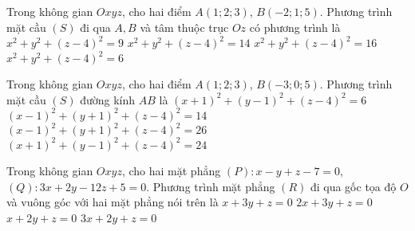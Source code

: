 \begin{ex}%
	Trong không gian $Oxyz$, cho hai điểm $A(1;2;3)$, $B(-2;1;5)$. Phương trình mặt cầu $(S)$ đi qua $A,B$ và tâm thuộc trục $Oz$ có phương trình là
	\choice
	{$x^2+y^2+(z-4)^2=9$}
	{$x^2+y^2+(z-4)^2=14$}
	{ $x^2+y^2+(z-4)^2=16$}
	{\True $x^2+y^2+(z-4)^2=6$}
\end{ex} 

\begin{ex}%
	Trong không gian $Oxyz$, cho hai điểm $A(1;2;3)$, $B(-3;0;5)$. Phương trình mặt cầu $(S)$ đường kính $AB$ là 
	\choice
	{\True $(x+1)^2+(y-1)^2+(z-4)^2=6$}
	{$(x-1)^2+(y+1)^2+(z-4)^2=14$}
	{ $(x-1)^2+(y+1)^2+(z-4)^2=26$}
	{ $(x+1)^2+(y-1)^2+(z-4)^2=24$}
\end{ex}

\begin{ex}%
	Trong không gian $Oxyz$, cho hai mặt phẳng $(P)\colon x-y+z-7=0$, $(Q)\colon 3x+2y-12z+5=0$. Phương trình mặt phẳng $(R)$ đi qua gốc tọa độ $O$ và vuông góc với hai mặt phẳng nói trên là 
	\choice
	{ $x+3y+z=0$}
	{\True $2x+3y+z=0$}
	{ $x+2y+z=0$}
	{ $3x+2y+z=0$}
\end{ex}

